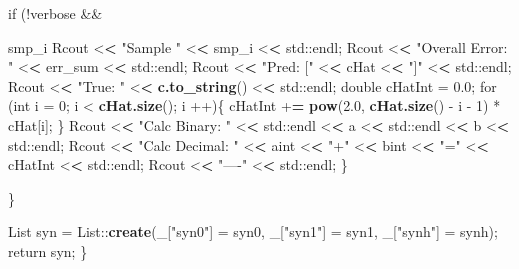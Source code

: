 \documentclass[]{article}
\newenvironment{Shaded}{\begin{snugshade}}{\end{snugshade}}
\newcommand{\KeywordTok}[1]{\textcolor[rgb]{0.13,0.29,0.53}{\textbf{{#1}}}}
\newcommand{\DataTypeTok}[1]{\textcolor[rgb]{0.13,0.29,0.53}{{#1}}}
\newcommand{\DecValTok}[1]{\textcolor[rgb]{0.00,0.00,0.81}{{#1}}}
\newcommand{\FloatTok}[1]{\textcolor[rgb]{0.00,0.00,0.81}{{#1}}}
\newcommand{\StringTok}[1]{\textcolor[rgb]{0.31,0.60,0.02}{{#1}}}
\newcommand{\ErrorTok}[1]{\textcolor[rgb]{0.64,0.00,0.00}{\textbf{{#1}}}}
\newcommand{\NormalTok}[1]{{#1}}
\begin{document}
\begin{Shaded}
\begin{Highlighting}[]
{{    \NormalTok{if (!verbose &&}\StringTok{ }\NormalTok{smp_i %
      \NormalTok{Rcout <}\ErrorTok{<}\StringTok{ "Sample "} \NormalTok{<}\ErrorTok{<}\StringTok{ }\NormalTok{smp_i <}\ErrorTok{<}\StringTok{ }\NormalTok{std::endl;}
      \NormalTok{Rcout <}\ErrorTok{<}\StringTok{ "Overall Error: "} \NormalTok{<}\ErrorTok{<}\StringTok{ }\NormalTok{err_sum <}\ErrorTok{<}\StringTok{ }\NormalTok{std::endl;}
      \NormalTok{Rcout <}\ErrorTok{<}\StringTok{ "Pred: ["} \NormalTok{<}\ErrorTok{<}\StringTok{ }\NormalTok{cHat <}\ErrorTok{<}\StringTok{ "]"} \NormalTok{<}\ErrorTok{<}\StringTok{ }\NormalTok{std::endl;}
      \NormalTok{Rcout <}\ErrorTok{<}\StringTok{ "True: "} \NormalTok{<}\ErrorTok{<}\StringTok{ }\KeywordTok{c.to_string}\NormalTok{() <}\ErrorTok{<}\StringTok{ }\NormalTok{std::endl;}
      \NormalTok{double cHatInt =}\StringTok{ }\FloatTok{0.0}\NormalTok{;}
      \NormalTok{for (int }\DataTypeTok{i =} \DecValTok{0}\NormalTok{; i <}\StringTok{ }\KeywordTok{cHat.size}\NormalTok{(); i ++)\{}
        \NormalTok{cHatInt +}\ErrorTok{=}\StringTok{ }\KeywordTok{pow}\NormalTok{(}\FloatTok{2.0}\NormalTok{, }\KeywordTok{cHat.size}\NormalTok{() -}\StringTok{ }\NormalTok{i -}\StringTok{ }\DecValTok{1}\NormalTok{) *}\StringTok{ }\NormalTok{cHat[i];}
      \NormalTok{\}}
      \NormalTok{Rcout <}\ErrorTok{<}\StringTok{ "Calc Binary: "} \NormalTok{<}\ErrorTok{<}\StringTok{ }\NormalTok{std::endl <}\ErrorTok{<}\StringTok{ }\NormalTok{a <}\ErrorTok{<}\StringTok{ }\NormalTok{std::endl <}\ErrorTok{<}\StringTok{ }\NormalTok{b <}\ErrorTok{<}\StringTok{ }\NormalTok{std::endl;}
      \NormalTok{Rcout <}\ErrorTok{<}\StringTok{ "Calc Decimal: "} \NormalTok{<}\ErrorTok{<}\StringTok{ }\NormalTok{aint <}\ErrorTok{<}\StringTok{ "+"} \NormalTok{<}\ErrorTok{<}\StringTok{ }\NormalTok{bint <}\ErrorTok{<}\StringTok{ "="} \NormalTok{<}\ErrorTok{<}\StringTok{ }\NormalTok{cHatInt <}\ErrorTok{<}\StringTok{ }\NormalTok{std::endl;}
      \NormalTok{Rcout <}\ErrorTok{<}\StringTok{ "----"} \NormalTok{<}\ErrorTok{<}\StringTok{ }\NormalTok{std::endl;}
    \NormalTok{\}}

  \NormalTok{\}}

  \NormalTok{List syn =}\StringTok{ }\NormalTok{List::}\KeywordTok{create}\NormalTok{(_[}\StringTok{"syn0"}\NormalTok{] =}\StringTok{ }\NormalTok{syn0,}
                          \NormalTok{_[}\StringTok{"syn1"}\NormalTok{] =}\StringTok{ }\NormalTok{syn1,}
                          \NormalTok{_[}\StringTok{"synh"}\NormalTok{] =}\StringTok{ }\NormalTok{synh);}
  \NormalTok{return syn;}
\NormalTok{\}}

}}}
\end{Highlighting}
\end{Shaded}
\end{document}
